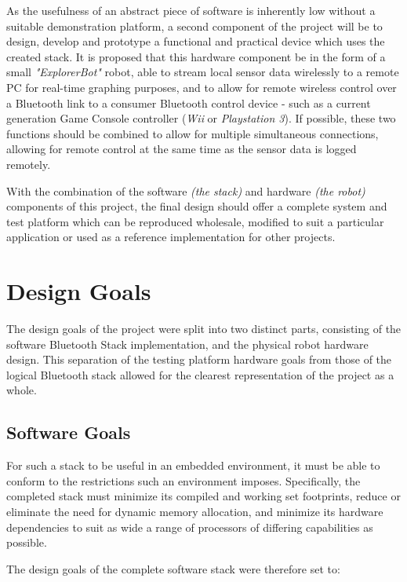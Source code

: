 As the usefulness of an abstract piece of software is inherently low without a suitable demonstration platform, a second component of the project will be to design, develop and prototype a functional and practical device which uses the created stack. It is proposed that this hardware component be in the form of a small \textit{"ExplorerBot"} robot, able to stream local sensor data wirelessly to a remote PC for real-time graphing purposes, and to allow for remote wireless control over a Bluetooth link to a consumer Bluetooth control device - such as a current generation Game Console controller (\textit{Wii} or \textit{Playstation 3}). If possible, these two functions should be combined to allow for multiple simultaneous connections, allowing for remote control at the same time as the sensor data is logged remotely.


With the combination of the software \emph{(the stack)} and hardware \emph{(the robot)} components of this project, the final design should offer a complete system and test platform which can be reproduced wholesale, modified to suit a particular application or used as a reference implementation for other projects.

\section{Design Goals}

The design goals of the project were split into two distinct parts, consisting of the software Bluetooth Stack implementation, and the physical robot hardware design. This separation of the testing platform hardware goals from those of the logical Bluetooth stack allowed for the clearest representation of the project as a whole.

\subsection{Software Goals}

For such a stack to be useful in an embedded environment, it must be able to conform to the restrictions such an environment imposes. Specifically, the completed stack must minimize its compiled and working set footprints, reduce or eliminate the need for dynamic memory allocation, and minimize its hardware dependencies to suit as wide a range of processors of differing capabilities as possible.

The design goals of the complete software stack were therefore set to:

